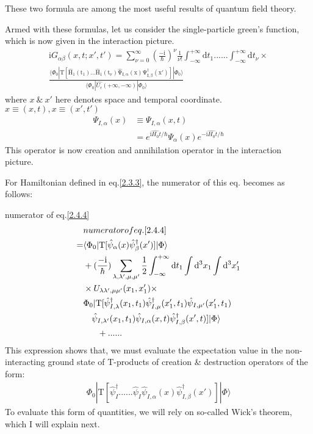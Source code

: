﻿\documentclass[twoside]{book}
\numberwithin{equation}{section}
\begin{document}
These two formula are among the most useful results of quantum field theory.


Armed with these formulas, let us consider the  single-particle green's function, which is now given in the interaction picture.
\begin{align}\label{2.4.4}
\mathrm{i}G_{\alpha\beta}(x,t;x',t')=\sum_{\nu=0}^{\infty}(\frac{-\mathrm{i}}{\hbar})^{\nu} \frac{1}{\nu!} \int_{-\infty}^{+\infty}\mathrm{d}t_1......\int_{-\infty}^{+\infty}\mathrm{d}t_{\nu}\times\nonumber  \\
\frac{\langle\Phi_0|\mathrm{T[\hat H_1(t_1)...\hat H_1(t_{\nu})\hat \Psi_{I,\alpha}(x)\Psi^{\dagger}_{I,\beta}(x')]}
|\Phi_0\rangle}{\langle\Phi_0|\hat{U_{\epsilon}}(+\infty,-\infty)|\Phi_0\rangle}
\end{align}
where $x\ \&\ x'$ here denotes space and temporal coordinate.$x\equiv(x,t),x\equiv (x',t')$
\begin{align}
\Psi_{I,\alpha}(x)&\equiv\Psi_{I,\alpha}(x,t) \nonumber \\
&=e^{\mathrm{i}\hat{H_0}t/\hbar}\Psi_{\alpha}(x)e^{-\mathrm{i}\hat{H_0}t/\hbar} \nonumber
\end{align}
This operator is now creation and annihilation operator in the interaction picture.

For Hamiltonian defined in eq.\ref{2.3.3}, the numerator of this eq. becomes as follows:

numerator of eq.\ref{2.4.4}
\begin{align}\label{2.4.5}
& numerator of eq.\ref{2.4.4} \nonumber \\
=&\langle \Phi_0|\mathrm{T}[\hat \psi_{\alpha }(x)\hat \psi_{\beta }^{\dagger}(x')]|\Phi\rangle \nonumber \\
&+(\frac{-\mathrm{i}}{\hbar})\sum_{\lambda,\lambda',\mu,\mu'}\frac{1}{2}\int_{-\infty}^{+\infty}\mathrm{d}t_1\int\mathrm{d}^3x_1\int\mathrm{d}^3x_1' \nonumber \\
&\times U_{\lambda\lambda',\mu\mu'}(x_1,x_1')\times \nonumber\\
&\Phi_0|\mathrm{T}[\hat \psi_{I,\lambda}^{\dagger}(x_1,t_1)\hat \psi_{I,\mu}^{\dagger}(x_1',t_1)\hat \psi_{I,\mu' }(x_1',t_1) \nonumber \\
&\ \ \ \hat \psi_{I,\lambda' }(x_1,t_1)\hat \psi_{I,\alpha}(x,t)\hat \psi^{\dagger}_{I,\beta }(x',t)]|\Phi\rangle \nonumber \\
&\ \ \ \ \ +......
\end{align}
This expression shows that, we must evaluate the expectation value in the non-interacting ground state of T-products of creation \& destruction operators of the form:
\begin{align}
\Phi_0|\mathrm{T}[\hat \psi_{I}^{\dagger}......\hat \psi_{I}\hat \psi_{I,\alpha}(x)\hat \psi^{\dagger}_{I,\beta }(x')]|\Phi\rangle \nonumber 
\end{align}
To evaluate this form of quantities, we will rely on so-called Wick's theorem, which I will explain next.
\end{document}
